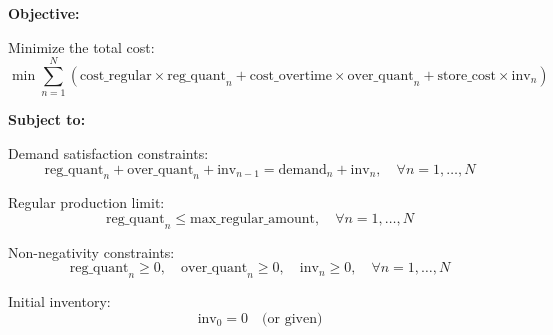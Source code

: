 \documentclass{article}
\begin{document}
\textbf{Objective:}

Minimize the total cost:
\[
\min \sum_{n=1}^{N} \left( \text{cost\_regular} \times \text{reg\_quant}_n + \text{cost\_overtime} \times \text{over\_quant}_n + \text{store\_cost} \times \text{inv}_n \right)
\]

\textbf{Subject to:}

Demand satisfaction constraints:
\[
\text{reg\_quant}_n + \text{over\_quant}_n + \text{inv}_{n-1} = \text{demand}_n + \text{inv}_n, \quad \forall n = 1, \ldots, N
\]

Regular production limit:
\[
\text{reg\_quant}_n \leq \text{max\_regular\_amount}, \quad \forall n = 1, \ldots, N
\]

Non-negativity constraints:
\[
\text{reg\_quant}_n \geq 0, \quad \text{over\_quant}_n \geq 0, \quad \text{inv}_n \geq 0, \quad \forall n = 1, \ldots, N
\]

Initial inventory:
\[
\text{inv}_0 = 0 \quad \text{(or given)}
\]
\end{document}
